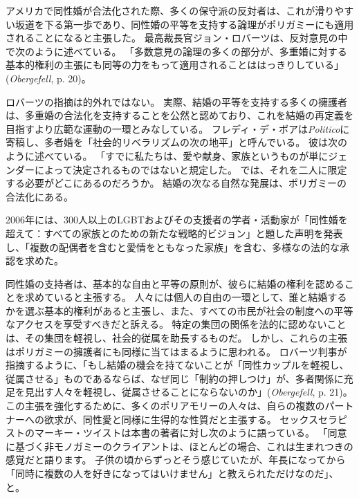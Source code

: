 \documentclass[paper=a4,book,openany]{jlreq} \usepackage{mystyle}
\begin{document}
アメリカで同性婚が合法化された際、多くの保守派の反対者は、これが滑りやすい坂道を下る第一歩であり、同性婚の平等を支持する論理がポリガミーにも適用されることになると主張した。
最高裁長官ジョン・ロバーツは、反対意見の中で次のように述べている。
「多数意見の論理の多くの部分が、多重婚に対する基本的権利の主張にも同等の力をもって適用されることははっきりしている」(\emph{Obergefell}, p. 20)。

ロバーツの指摘は的外れではない。
実際、結婚の平等を支持する多くの擁護者は、多重婚の合法化を支持することを公然と認めており、これを結婚の再定義を目指すより広範な運動の一環とみなしている。
フレディ・デ・ボアは\emph{Politico}に寄稿し、多者婚を「社会的リベラリズムの次の地平」と呼んでいる。
彼は次のように述べている。
「すでに私たちは、愛や献身、家族というものが単にジェンダーによって決定されるものではないと規定した。
では、それを二人に限定する必要がどこにあるのだろうか。
結婚の次なる自然な発展は、ポリガミーの合法化にある\citep{deboer15:_it_time_legal_polyg}。

2006年には、300人以上のLGBTおよびその支援者の学者・活動家が「同性婚を超えて：すべての家族とのための新たな戦略的ビジョン」と題した声明を発表し、「複数の配偶者を含むと愛情をともなった家族」を含む、多様なの法的な承認を求めた\citep{MR06:_beyon_same_sex_marriag}。

同性婚の支持者は、基本的な自由と平等の原則が、彼らに結婚の権利を認めることを求めていると主張する。
人々には個人の自由の一環として、誰と結婚するかを選ぶ基本的権利があると主張し、また、すべての市民が社会の制度への平等なアクセスを享受すべきだと訴える。
特定の集団の関係を法的に認めないことは、その集団を軽視し、社会的従属を助長するものだ。
しかし、これらの主張はポリガミーの擁護者にも同様に当てはまるように思われる。
ロバーツ判事が指摘するように、「もし結婚の機会を持てないことが「同性カップルを軽視し、従属させる」ものであるならば、なぜ同じ「制約の押しつけ」が、多者関係に充足を見出す人々を軽視し、従属させることにならないのか」(\emph{Obergefell}, p. 21)。
この主張を強化するために、多くのポリアモリーの人々は、自らの複数のパートナーへの欲求が、同性愛と同様に生得的な性質だと主張する。
セックスセラピストのマーキー・ツイストは本書の著者に対し次のように語っている。
「同意に基づく非モノガミーのクライアントは、ほとんどの場合、これは生まれつきの感覚だと語ります。
子供の頃からずっとそう感じていたが、年長になってから「同時に複数の人を好きになってはいけません」と教えられただけなのだ」、と\citep{mcarthur16:_why_peopl_are_fight_get}。
\end{document}
